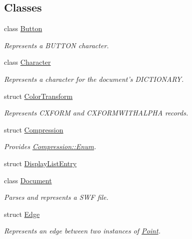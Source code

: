 \subsection*{Classes}
\begin{DoxyCompactItemize}
\item 
class \hyperlink{classjswf_1_1flash_1_1_button}{Button}
\begin{DoxyCompactList}\small\item\em Represents a {\ttfamily B\+U\+T\+T\+O\+N} character. \end{DoxyCompactList}\item 
class \hyperlink{classjswf_1_1flash_1_1_character}{Character}
\begin{DoxyCompactList}\small\item\em Represents a character for the document's {\ttfamily D\+I\+C\+T\+I\+O\+N\+A\+R\+Y}. \end{DoxyCompactList}\item 
struct \hyperlink{structjswf_1_1flash_1_1_color_transform}{Color\+Transform}
\begin{DoxyCompactList}\small\item\em Represents {\ttfamily C\+X\+F\+O\+R\+M} and {\ttfamily C\+X\+F\+O\+R\+M\+W\+I\+T\+H\+A\+L\+P\+H\+A} records. \end{DoxyCompactList}\item 
struct \hyperlink{structjswf_1_1flash_1_1_compression}{Compression}
\begin{DoxyCompactList}\small\item\em Provides \hyperlink{structjswf_1_1flash_1_1_compression_a393e4fe7bb01f081e0c1d1d009c22c2a}{Compression\+::\+Enum}. \end{DoxyCompactList}\item 
struct \hyperlink{structjswf_1_1flash_1_1_display_list_entry}{Display\+List\+Entry}
\item 
class \hyperlink{classjswf_1_1flash_1_1_document}{Document}
\begin{DoxyCompactList}\small\item\em Parses and represents a {\ttfamily S\+W\+F file}. \end{DoxyCompactList}\item 
struct \hyperlink{structjswf_1_1flash_1_1_edge}{Edge}
\begin{DoxyCompactList}\small\item\em Represents an edge between two instances of \hyperlink{structjswf_1_1flash_1_1_point}{Point}. \end{DoxyCompactList}\item 

\end{DoxyCompactItemize}
